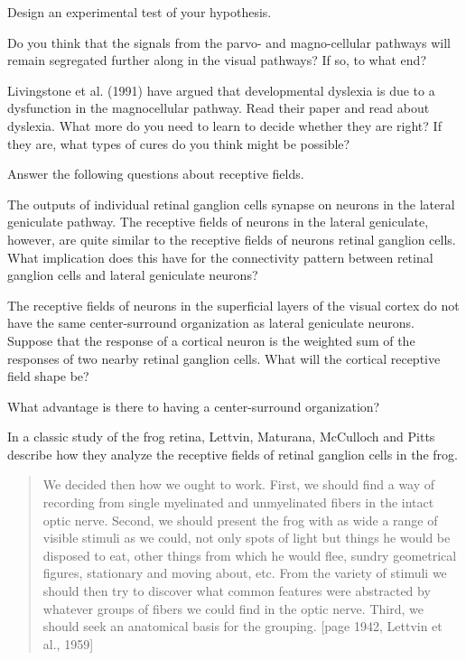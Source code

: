 \item Design an experimental test of your hypothesis.

\item Do you think that the signals from the parvo- and magno-cellular
pathways will remain segregated further along in the
visual pathways?  If so, to what end?

 \item Livingstone et al. (1991) have argued that developmental
dyslexia is due to a dysfunction in the magnocellular pathway.
Read their paper and read about dyslexia.
What more do you need to learn to decide whether they are right?
If they are, what types of cures do you think might be possible?

\ee

\item Answer the following questions about receptive fields.

\be

 \item The outputs of individual retinal ganglion cells
synapse on neurons in the lateral geniculate pathway.
The receptive fields of neurons in the lateral geniculate,
however, are quite similar to the receptive fields
of neurons retinal ganglion cells.
What implication does this have for the connectivity
pattern between retinal ganglion cells and lateral geniculate neurons?

 \item The receptive fields of neurons in the superficial
layers of the visual cortex
do not have the same center-surround organization
as lateral geniculate neurons.
Suppose that the response of a cortical neuron is the weighted
sum of the responses of two nearby retinal ganglion cells.
What will the cortical receptive field shape be?


 \item What advantage is there to having
a center-surround organization?

 \item In a classic study of the frog retina, Lettvin,
Maturana, McCulloch and Pitts describe how they analyze
the receptive fields of retinal ganglion cells in the frog.
\begin{quote}
We decided then how we ought to work.
First, we should find a way of recording from single
myelinated and unmyelinated fibers in the intact optic nerve.
Second, we should present the frog with as wide a range of
visible stimuli as we could, not only spots of light
but things he would be disposed to eat, other things from which
he would flee, sundry geometrical figures, stationary and moving
about, etc.
From the variety of stimuli we should then try to discover what common
features were abstracted by whatever groups of fibers we could find in
the
optic nerve.
Third, we should seek an anatomical basis for the grouping.
[page 1942, Lettvin et al., 1959]
\end{quote}

